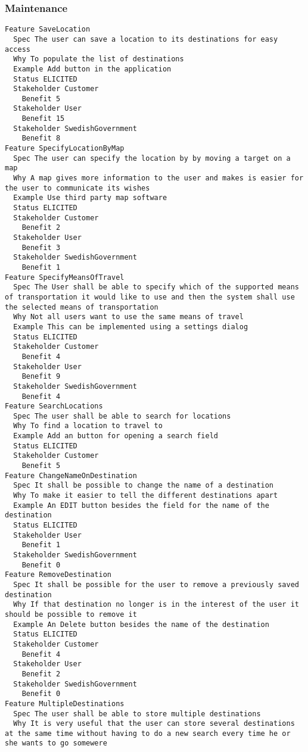         
       \subsubsection{Maintenance}


\begin{lstlisting}
Feature SaveLocation
  Spec The user can save a location to its destinations for easy access
  Why To populate the list of destinations
  Example Add button in the application
  Status ELICITED
  Stakeholder Customer
    Benefit 5
  Stakeholder User
    Benefit 15
  Stakeholder SwedishGovernment
    Benefit 8
Feature SpecifyLocationByMap
  Spec The user can specify the location by by moving a target on a map
  Why A map gives more information to the user and makes is easier for the user to communicate its wishes
  Example Use third party map software
  Status ELICITED
  Stakeholder Customer
    Benefit 2
  Stakeholder User
    Benefit 3
  Stakeholder SwedishGovernment
    Benefit 1
Feature SpecifyMeansOfTravel
  Spec The User shall be able to specify which of the supported means of transportation it would like to use and then the system shall use the selected means of transportation
  Why Not all users want to use the same means of travel
  Example This can be implemented using a settings dialog
  Status ELICITED
  Stakeholder Customer
    Benefit 4
  Stakeholder User
    Benefit 9
  Stakeholder SwedishGovernment
    Benefit 4
Feature SearchLocations
  Spec The user shall be able to search for locations
  Why To find a location to travel to
  Example Add an button for opening a search field
  Status ELICITED
  Stakeholder Customer
    Benefit 5
Feature ChangeNameOnDestination
  Spec It shall be possible to change the name of a destination
  Why To make it easier to tell the different destinations apart
  Example An EDIT button besides the field for the name of the destination
  Status ELICITED
  Stakeholder User
    Benefit 1
  Stakeholder SwedishGovernment
    Benefit 0
Feature RemoveDestination
  Spec It shall be possible for the user to remove a previously saved destination
  Why If that destination no longer is in the interest of the user it should be possible to remove it
  Example An Delete button besides the name of the destination
  Status ELICITED
  Stakeholder Customer
    Benefit 4
  Stakeholder User
    Benefit 2
  Stakeholder SwedishGovernment
    Benefit 0
Feature MultipleDestinations
  Spec The user shall be able to store multiple destinations
  Why It is very useful that the user can store several destinations at the same time without having to do a new search every time he or she wants to go somewere

\end{lstlisting}
